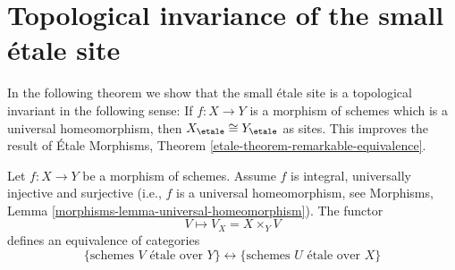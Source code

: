 \section{Topological invariance of the small \'etale site}
\label{section-topological-invariance}

\noindent
In the following theorem we show that the small \'etale site is a topological
invariant in the following sense: If $f : X \to Y$ is a morphism of schemes
which is a universal homeomorphism, then
$X_\etale \cong Y_\etale$
as sites. This improves the result of
\'Etale Morphisms, Theorem \ref{etale-theorem-remarkable-equivalence}.

\begin{theorem}
\label{theorem-topological-invariance}
Let $f : X \to Y$ be a morphism of schemes.
Assume $f$ is integral, universally injective and surjective
(i.e., $f$ is a universal homeomorphism, see
Morphisms, Lemma \ref{morphisms-lemma-universal-homeomorphism}).
The functor
$$
V \longmapsto V_X = X \times_Y V
$$
defines an equivalence of categories
$$
\{
\text{schemes }V\text{ \'etale over }Y
\}
\leftrightarrow
\{
\text{schemes }U\text{ \'etale over }X
\}
$$
\end{theorem}

